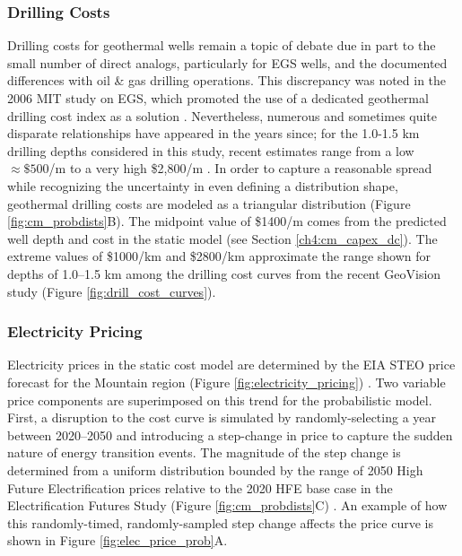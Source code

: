 \subsubsection{Drilling Costs}\label{cm4:prob_dc}
Drilling costs for geothermal wells remain a topic of debate due in part to the small number of direct analogs, particularly for EGS wells, and the documented differences with oil \& gas drilling operations. This discrepancy was noted in the 2006 MIT study on EGS, which promoted the use of a dedicated geothermal drilling cost index as a solution \citep{tester_future_2006}. Nevertheless, numerous and sometimes quite disparate relationships have appeared in the years since; for the 1.0-1.5 km drilling depths considered in this study, recent estimates range from a low $\approx\$500$/m \citep{lukawski_uncertainty_2016} to a very high \$2,800/m \citep{lowry_implications_2017}. In order to capture a reasonable spread while recognizing the uncertainty in even defining a distribution shape, geothermal drilling costs are modeled as a triangular distribution (Figure \ref{fig:cm_probdists}B). The midpoint value of \$1400/m comes from the predicted well depth and cost in the static model (see Section \ref{ch4:cm_capex_dc}). The extreme values of \$1000/km and \$2800/km approximate the range shown for depths of 1.0--1.5 km among the drilling cost curves from the recent GeoVision study (Figure \ref{fig:drill_cost_curves}).

\subsubsection{Electricity Pricing}\label{cm4:prob_price}
Electricity prices in the static cost model are determined by the EIA STEO price forecast for the Mountain region (Figure \ref{fig:electricity_pricing}) \citep{eia_short-term_2021}. Two variable price components are superimposed on this trend for the probabilistic model. First, a disruption to the cost curve is simulated by randomly-selecting a year between 2020--2050 and introducing a step-change in price to capture the sudden nature of energy transition events. The magnitude of the step change is determined from a uniform distribution bounded by the range of 2050 High Future Electrification prices relative to the 2020 HFE base case in the Electrification Futures Study (Figure \ref{fig:cm_probdists}C) \citep{murphy_electrification_2021}. An example of how this randomly-timed, randomly-sampled step change affects the price curve is shown in Figure \ref{fig:elec_price_prob}A. 

